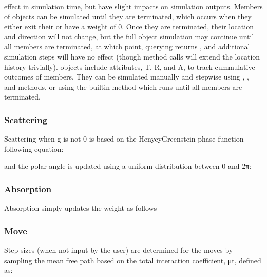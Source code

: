 \documentclass[letterpaper,10pt,english]{sphinxmanual}
\begin{document}
effect in simulation time, but have slight impacts on simulation outputs. Members of  objects can be simulated
until they are terminated, which occurs when they either exit their  or have a weight of 0. Once they are
terminated, their location and direction will not change, but the full object simulation may continue until all members
are terminated, at which point, querying  returns , and additional simulation steps will
have no effect (though  method calls will extend the location history trivially).  objects include
attributes, T, R, and A, to track cummulative outcomes of members. They can be simulated manually and step\sphinxhyphen{}wise using
, , and  methods, or using the builtin  method which runs until all members are
terminated.


\subsubsection{Scattering}
\label{\detokenize{README:scattering}}
\sphinxAtStartPar
Scattering when g is not 0 is based on the Henyey\sphinxhyphen{}Greenstein phase function following equation:



\sphinxAtStartPar
and the polar angle is updated using a uniform distribution between 0 and 2π:




\subsubsection{Absorption}
\label{\detokenize{README:absorption}}
\sphinxAtStartPar
Absorption simply updates the weight as follows




\subsubsection{Move}
\label{\detokenize{README:move}}
\sphinxAtStartPar
Step sizes (when not input by the user) are determined for the moves by sampling the mean free path based on the
total interaction coefficient, μt, defined as:
\end{document}
